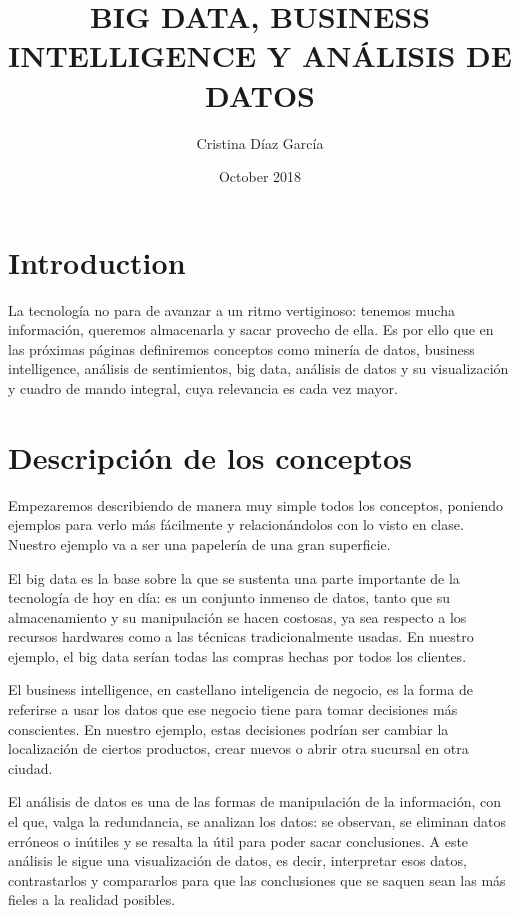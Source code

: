 \documentclass{article}
\title{BIG DATA, BUSINESS INTELLIGENCE Y ANÁLISIS DE DATOS}
\author{Cristina Díaz García}
\date{October 2018}
\begin{document}

\begin{titlingpage}
\maketitle
\end{titlingpage}

\newpage

\tableofcontents

\newpage

\section{Introduction}
La tecnología no para de avanzar a un ritmo vertiginoso: tenemos mucha información, queremos almacenarla y sacar provecho de ella. Es por ello que en las próximas páginas definiremos conceptos como minería de datos, business intelligence, análisis de sentimientos, big data, análisis de datos y su visualización y cuadro de mando integral, cuya relevancia es cada vez mayor.

\section{Descripción de los conceptos}
Empezaremos describiendo de manera muy simple todos los conceptos, poniendo ejemplos para verlo más fácilmente y relacionándolos con lo visto en clase. Nuestro ejemplo va a ser una papelería de una gran superficie.

El big data es la base sobre la que se sustenta una parte importante de la tecnología de hoy en día: es un conjunto inmenso de datos, tanto que su almacenamiento y su manipulación se hacen costosas, ya sea respecto a los recursos hardwares como a las técnicas tradicionalmente usadas. En nuestro ejemplo, el big data serían todas las compras hechas por todos los clientes.

El business intelligence, en castellano inteligencia de negocio, es la forma de referirse a usar los datos que ese negocio tiene para tomar decisiones más conscientes. En nuestro ejemplo, estas decisiones podrían ser cambiar la localización de ciertos productos, crear nuevos o abrir otra sucursal en otra ciudad. 

El análisis de datos es una de las formas de manipulación de la información, con el que, valga la redundancia, se analizan los datos: se observan, se eliminan datos erróneos o inútiles y se resalta la útil para poder sacar conclusiones. A este análisis le sigue una visualización de datos, es decir, interpretar esos datos, contrastarlos y compararlos para que las conclusiones que se saquen sean las más fieles a la realidad posibles. 
\end{document}
